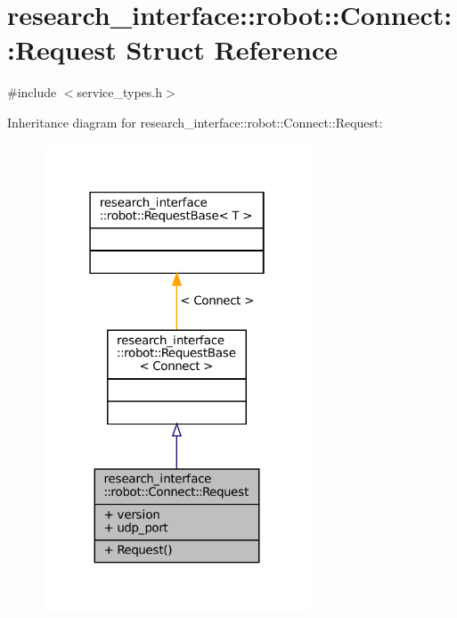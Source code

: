 \hypertarget{structresearch__interface_1_1robot_1_1Connect_1_1Request}{}\section{research\+\_\+interface\+:\+:robot\+:\+:Connect\+:\+:Request Struct Reference}
\label{structresearch__interface_1_1robot_1_1Connect_1_1Request}


{\ttfamily \#include $<$service\+\_\+types.\+h$>$}



Inheritance diagram for research\+\_\+interface\+:\+:robot\+:\+:Connect\+:\+:Request\+:
\nopagebreak
\begin{figure}[H]
\begin{center}
\leavevmode
\includegraphics[width=226pt]{structresearch__interface_1_1robot_1_1Connect_1_1Request__inherit__graph}
\end{center}
\end{figure}


